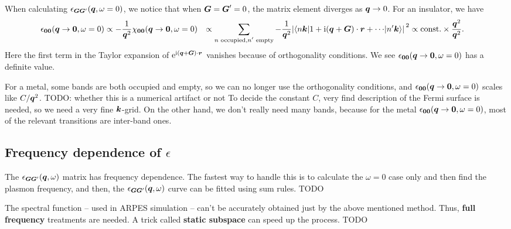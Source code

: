 \documentclass[hyperref, a4paper, 12pt]{report}
\newcommand*{\ii}{\mathrm{i}}
\newcommand*{\ee}{\mathrm{e}}
\newcommand*{\const}{\mathrm{const}}
\newcommand*{\concept}[1]{{\textbf{#1}}}
\def\\{}%
\begin{document}
When calculating $\epsilon_{\vb*{G} \vb*{G}'}(\vb*{q}, \omega = 0)$,
we notice that when $\vb*{G} = \vb*{G}' = 0$,
the matrix element diverges as $\vb*{q} \to 0$.
For an insulator, we have 
\begin{equation}
    \begin{aligned}
        \epsilon_{\vb*{0} \vb*{0}} (\vb*{q} \to \vb*{0}, \omega = 0)
        &\propto - \frac{1}{\vb*{q}^2} \chi_{\vb*{0} \vb*{0}} (\vb*{q} \to \vb*{0}, \omega = 0) \\
        &\propto \sum_{\text{$n$ occupied}, \text{$n'$ empty}} - \frac{1}{\vb*{q}^2} 
        \abs*{
            \mel**{n \vb*{k}}{1 + \ii (\vb*{q} + \vb*{G}) \cdot \vb*{r} + \cdots }{n' \vb*{k}}
        }^2 \\
        &\propto \const. \times \frac{\vb*{q}^2}{\vb*{q}^2}.
    \end{aligned}
\end{equation}
Here the first term in the Taylor expansion of $\ee^{\ii (\vb*{q} + \vb*{G}) \cdot \vb*{r}}$ vanishes
because of orthogonality conditions.
We see $\epsilon_{\vb*{0} \vb*{0}} (\vb*{q} \to \vb*{0}, \omega = 0)$
has a definite value.

For a metal, some bands are both occupied and empty,
so we can no longer use the orthogonality conditions,
and $\epsilon_{\vb*{0} \vb*{0}} (\vb*{q} \to \vb*{0}, \omega = 0)$ 
scales like $C / \vb*{q}^2$.
TODO: whether this is a numerical artifact or not 
To decide the constant $C$,
very find description of the Fermi surface is needed,
so we need a very fine $\vb*{k}$-grid.
On the other hand, 
we don't really need many bands,
because for the metal $\epsilon_{\vb*{0} \vb*{0}} (\vb*{q} \to \vb*{0}, \omega = 0)$,
most of the relevant transitions are inter-band ones.

\subsection{Frequency dependence of $\epsilon$}

The $\epsilon_{\vb*{G} \vb*{G}'}(\vb*{q}, \omega)$ matrix has frequency dependence.
The fastest way to handle this is to calculate the $\omega = 0$ case only 
and then find the plasmon frequency,
and then, the $\epsilon_{\vb*{G} \vb*{G}'}(\vb*{q}, \omega)$ curve 
can be fitted using sum rules. TODO 

The spectral function -- used in ARPES simulation -- 
can't be accurately obtained just by the above mentioned method.
Thus, \concept{full frequency} treatments are needed.
A trick called \concept{static subspace} can speed up the process. TODO
\end{document}
